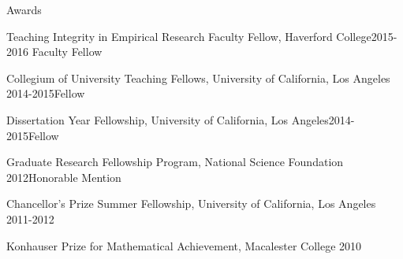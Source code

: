 \documentclass{resume} %
\begin{document}

\begin{rSection}{Awards}
\begin{esSubsection}{Teaching Integrity in Empirical Research Faculty Fellow,}{ Haverford College}{2015-2016}
{Faculty Fellow}{}
\end{esSubsection}
\begin{esSubsection}{Collegium of University Teaching Fellows,}{ University of California, Los Angeles }{2014-2015}{Fellow}{}
\end{esSubsection}
\begin{esSubsection}{Dissertation Year Fellowship,}{ University of California, Los Angeles}{2014-2015}{Fellow}{}
\end{esSubsection}
\begin{esSubsection}{Graduate Research Fellowship Program,}{ National Science Foundation }{2012}{Honorable Mention}{}
\end{esSubsection}
\begin{esSubsection}{Chancellor's Prize Summer Fellowship,}{ University of California, Los Angeles }{2011-2012}{}{}
\end{esSubsection}
\begin{esSubsection}{Konhauser Prize for Mathematical Achievement,}{ Macalester College}{ 2010}{}{}
\end{esSubsection}
\end{rSection}



\end{document}
